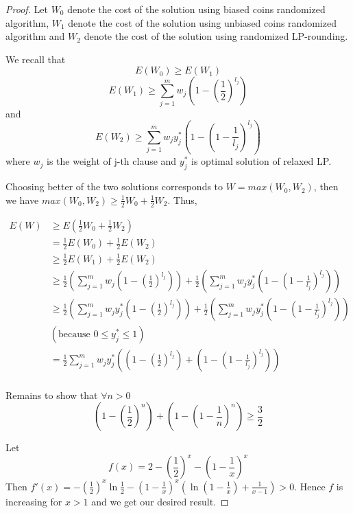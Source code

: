 \documentclass[12pt]{article}
\begin{document}
\begin{proof}
Let $W_0$ denote the cost of the solution using biased coins randomized algorithm, $W_1$ denote the cost of the solution using unbiased coins randomized algorithm and $W_2$ denote the cost of the solution using randomized LP-rounding.

We recall that 
$$E(W_0) \geq E(W_1)$$
$$E(W_1) \geq \sum_{j=1}^m w_j \left(1-\left(\frac{1}{2}\right)^{l_j}\right) $$
and
$$E(W_2) \geq \sum_{j=1}^m w_jy_j^* \left(1-\left(1-\frac{1}{l_j}\right)^{l_j}\right)$$
where $w_j$ is the weight of j-th clause and $y_j^*$ is optimal solution of relaxed LP.

Choosing better of the two solutions corresponds to $W = max(W_0, W_2)$, then we have $max(W_0, W_2) \geq \frac{1}{2}W_0+\frac{1}{2}W_2$. Thus,

\begin{align*}
    E(W) &\geq E\left(\frac{1}{2}W_0 + \frac{1}{2}W_2\right) \\
    &= \frac{1}{2}E(W_0) + \frac{1}{2}E(W_2) \\
    &\geq \frac{1}{2}E(W_1) + \frac{1}{2}E(W_2) \\
    &\geq \frac{1}{2}\left(\sum_{j=1}^m w_j \left(1-\left(\frac{1}{2}\right)^{l_j}\right)\right) + \frac{1}{2}\left(\sum_{j=1}^m w_jy_j^* \left(1-\left(1-\frac{1}{l_j}\right)^{l_j}\right)\right) \\
    &\geq \frac{1}{2}\left(\sum_{j=1}^m w_jy_j^* \left(1-\left(\frac{1}{2}\right)^{l_j}\right)\right) + \frac{1}{2}\left(\sum_{j=1}^m w_jy_j^* \left(1-\left(1-\frac{1}{l_j}\right)^{l_j}\right)\right) \\
    & (\text{because } 0 \leq y_j^* \leq 1) \\
    &= \frac{1}{2}\sum_{j=1}^m w_jy_j^* \left( \left(1-\left(\frac{1}{2}\right)^{l_j}\right) + \left(1-\left(1-\frac{1}{l_j}\right)^{l_j}\right)\right) \\
\end{align*}

Remains to show that $\forall n > 0$
$$\left(1-\left(\frac{1}{2}\right)^n\right) + \left(1-\left(1-\frac{1}{n}\right)^n\right) \geq \frac{3}{2}$$

Let $$f(x) = 2 - \left(\frac{1}{2}\right)^x - \left(1-\frac{1}{x}\right)^x$$
Then $f'(x) = - \left(\frac{1}{2}\right)^x\ln\frac{1}{2} - \left(1-\frac{1}{x}\right)^x\left(\ln(1-\frac{1}{x})+ \frac{1}{x-1}\right) > 0$. Hence $f$ is increasing for $x > 1$ and we get our desired result.

\end{proof}
\end{document}
